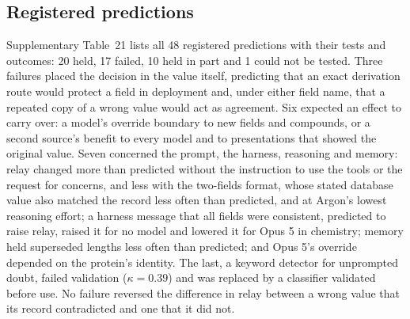\subsection*{Registered predictions}

Supplementary Table~21 lists all 48 registered predictions with their tests and outcomes: 20 held, 17 failed, 10 held in part and 1 could not be tested. Three failures placed the decision in the value itself, predicting that an exact derivation route would protect a field in deployment and, under either field name, that a repeated copy of a wrong value would act as agreement. Six expected an effect to carry over: a model's override boundary to new fields and compounds, or a second source's benefit to every model and to presentations that showed the original value. Seven concerned the prompt, the harness, reasoning and memory: relay changed more than predicted without the instruction to use the tools or the request for concerns, and less with the two-fields format, whose stated database value also matched the record less often than predicted, and at Argon's lowest reasoning effort; a harness message that all fields were consistent, predicted to raise relay, raised it for no model and lowered it for Opus 5 in chemistry; memory held superseded lengths less often than predicted; and Opus 5's override depended on the protein's identity. The last, a keyword detector for unprompted doubt, failed validation ($\kappa = 0.39$) and was replaced by a classifier validated before use. No failure reversed the difference in relay between a wrong value that its record contradicted and one that it did not.
